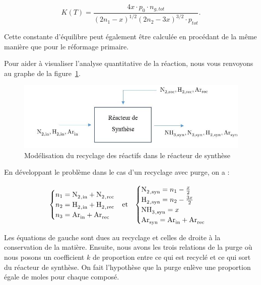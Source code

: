 $$K(T) = \frac{4x\cdot p_0\cdot n_{g,tot}}{(2n_1 - x)^{1/2} (2n_2 - 3x)^{3/2} \cdot p_{tot}}.$$

Cette constante d'équilibre peut également être calculée en procédant de la même manière que pour le réformage primaire. 

Pour aider à visualiser l'analyse quantitative de la réaction, nous vous renvoyons au graphe de la figure~\ref{fig:purge}.

\begin{figure}
	\centering
	\includegraphics[scale=0.5]{media/reacteurNH3.jpg}
	\caption{Modélisation du recyclage des réactifs dans le réacteur de synthèse}
	\label{fig:purge}
\end{figure}

En développant le problème dans le cas d'un recyclage avec purge, on a :

\begin{align}
	\notag
	\begin{cases}
	 n_1 = \ce{N2_{,in} + N2_{,rec}} \\
	 n_2 = \ce{H2_{,in} + H2_{,rec}} \\
	 n_3 = \ce{Ar_{in} + Ar_{rec}} \\
	\end{cases}
	 &  \text{et}  &
	\begin{cases}
	 \ce{N2_{,syn}} = n_1 - \frac{x}{2} \\
	 \ce{H2_{,syn}} = n_2 - \frac{3x}{2} \\
	 \ce{NH3_{,syn}} = x \\
	 \ce{Ar_{syn} = Ar_{in} + Ar_{rec}} \\ 
	\end{cases}
	\\
\end{align}

Les équations de gauche sont dues au recyclage et celles de droite 
à la conservation de la matière. Ensuite, nous avons les trois relations
de la purge où nous posons un coefficient $k$ de proportion entre ce qui
est recyclé et ce qui sort du réacteur de synthèse. On fait l'hypothèse
que la purge enlève une proportion égale de moles pour chaque composé.

